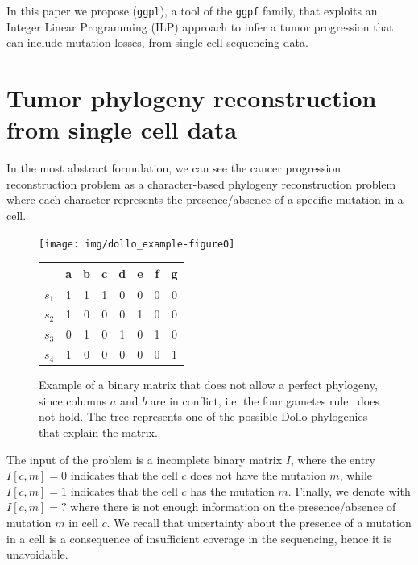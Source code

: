 \documentclass[a4paper,USenglish]{article}
\theoremstyle{definition}
\begin{document}
In this paper we propose (\texttt{ggpl}), a tool of the \texttt{ggpf} family, that
exploits an Integer Linear Programming (ILP) approach to infer a tumor progression that
can include mutation losses, from
single cell sequencing data.

\section{Tumor phylogeny reconstruction from single cell data}

In the most abstract formulation, we can see the cancer progression reconstruction problem
as a
character-based phylogeny reconstruction problem~\cite{Gusfield} where each character
represents  the presence/absence of a specific mutation in a cell.


\begin{figure}[tb!]
  \begin{minipage}[c]{0.55\textwidth}
     \texttt{[image: img/dollo\_example-figure0]}
\end{minipage}
\begin{minipage}[t]{0.3\textwidth}
        \begin{tabular}[!t]{c|ccccccc}
             & a & b & c & d & e & f & g  \\ \hline
            $s_1$ & 1 & 1 & 1 & 0 & 0 & 0 & 0 \\
            $s_2$ & 1 & 0 & 0 & 0 & 1 & 0 & 0 \\
            $s_3$ & 0 & 1 & 0 & 1 & 0 & 1 & 0 \\
            $s_4$ & 1 & 0 & 0 & 0 & 0 & 0 & 1
        \end{tabular}
        \end{minipage}
  \caption{Example of a binary matrix that does not allow a perfect phylogeny, since columns $a$ and $b$ are in conflict, i.e. the four gametes rule~\cite{gusfield1991}
  does not hold. The tree represents one of the possible Dollo phylogenies that explain the matrix.}
\label{fig:dollo}
\end{figure}

The input of the problem is a incomplete binary matrix $I$, where the entry $I[c,m]=0$ indicates
that the cell $c$ does not have the mutation $m$, while $I[c,m]=1$ indicates that the
cell $c$ has the mutation $m$.
Finally, we denote with $I[c,m]=?$ where there is not enough information on the
presence/absence of mutation $m$ in cell $c$. 
We recall that uncertainty about the presence of a mutation in a cell is a consequence of
insufficient coverage in the sequencing, hence it is unavoidable.
\end{document}

